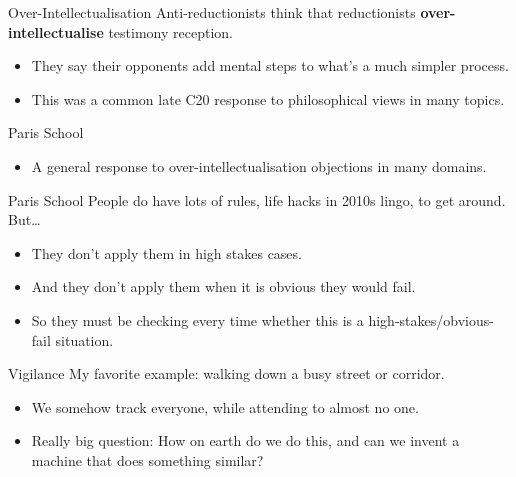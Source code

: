\documentclass[
  17pt,
  letterpaper,
  ignorenonframetext,
  aspectratio=169,
]{beamer}
\providecommand{\tightlist}{%
  \setlength{\itemsep}{0pt}\setlength{\parskip}{0pt}}\usepackage{longtable,booktabs,array}
\begin{document}
\begin{frame}{Over-Intellectualisation}
\protect\hypertarget{over-intellectualisation}{}
Anti-reductionists think that reductionists
\textbf{over-intellectualise} testimony reception.

\begin{itemize}[<+->]
\tightlist
\item
  They say their opponents add mental steps to what's a much simpler
  process.
\item
  This was a common late C20 response to philosophical views in many
  topics.
\end{itemize}
\end{frame}

\begin{frame}{Paris School}
\protect\hypertarget{paris-school}{}
\begin{itemize}[<+->]
\tightlist
\item
  A general response to over-intellectualisation objections in many
  domains.
\end{itemize}
\end{frame}

\begin{frame}{Paris School}
\protect\hypertarget{paris-school-1}{}
People do have lots of rules, life hacks in 2010s lingo, to get around.
But\ldots{}

\begin{itemize}[<+->]
\tightlist
\item
  They don't apply them in high stakes cases.
\item
  And they don't apply them when it is obvious they would fail.
\item
  So they must be checking every time whether this is a
  high-stakes/obvious-fail situation.
\end{itemize}
\end{frame}

\begin{frame}{Vigilance}
\protect\hypertarget{vigilance}{}
My favorite example: walking down a busy street or corridor.

\begin{itemize}[<+->]
\tightlist
\item
  We somehow track everyone, while attending to almost no one.
\item
  Really big question: How on earth do we do this, and can we invent a
  machine that does something similar?
\end{itemize}
\end{frame}
\end{document}
